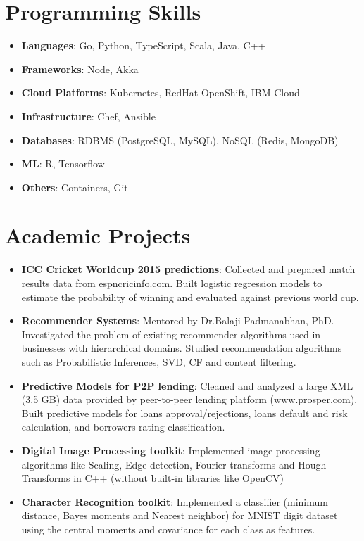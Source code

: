 \documentclass[a4paper,11pt]{article}
\newcommand{\resumeItem}[2]{
  \item[]\small{
    \textbf{#1}{: #2 \vspace{-2pt}}
  }
}
\newcommand{\resumeSubItem}[2]{\resumeItem{#1}{#2}\vspace{-4pt}}
\newcommand{\resumeSubHeadingListStart}{\begin{itemize}[leftmargin=*]}
\newcommand{\resumeSubHeadingListEnd}{\end{itemize}}
\begin{document}
\section{Programming Skills}
\resumeSubHeadingListStart
\resumeSubItem{Languages}
{Go, Python, TypeScript, Scala, Java, C++}
\resumeSubItem{Frameworks}
{Node, Akka}
\resumeSubItem{Cloud Platforms}
{Kubernetes, RedHat OpenShift, IBM Cloud}
\resumeSubItem{Infrastructure}
{Chef, Ansible}
\resumeSubItem{Databases}
{RDBMS (PostgreSQL, MySQL), NoSQL (Redis, MongoDB)}
\resumeSubItem{ML}
{R, Tensorflow}
\resumeSubItem{Others}
{Containers, Git}
\resumeSubHeadingListEnd

\section{Academic Projects}
\resumeSubHeadingListStart
\resumeSubItem{ICC Cricket Worldcup 2015 predictions}
{Collected and prepared match results data from espncricinfo.com.
    Built logistic regression models to estimate the probability of winning and evaluated against previous world cup.}
\resumeSubItem{Recommender Systems}
{Mentored by Dr.Balaji Padmanabhan, PhD. Investigated the problem of existing recommender algorithms used in businesses with hierarchical domains.
    Studied recommendation algorithms such as Probabilistic Inferences, SVD, CF and content filtering.}
\resumeSubItem{Predictive Models for P2P lending}
{Cleaned and analyzed a large XML (3.5 GB) data provided by peer-to-peer lending platform (www.prosper.com).
    Built predictive models for loans approval/rejections, loans default and risk calculation, and borrowers rating classification.}
\resumeSubItem{Digital Image Processing toolkit}
{Implemented image processing algorithms like Scaling, Edge detection, Fourier transforms and Hough Transforms in C++ (without built-in libraries like OpenCV)}
\resumeSubItem{Character Recognition toolkit}
{Implemented a classifier (minimum distance, Bayes moments and Nearest neighbor) for MNIST digit dataset using the central moments and covariance for each class as features.}
\resumeSubHeadingListEnd


\end{document}
